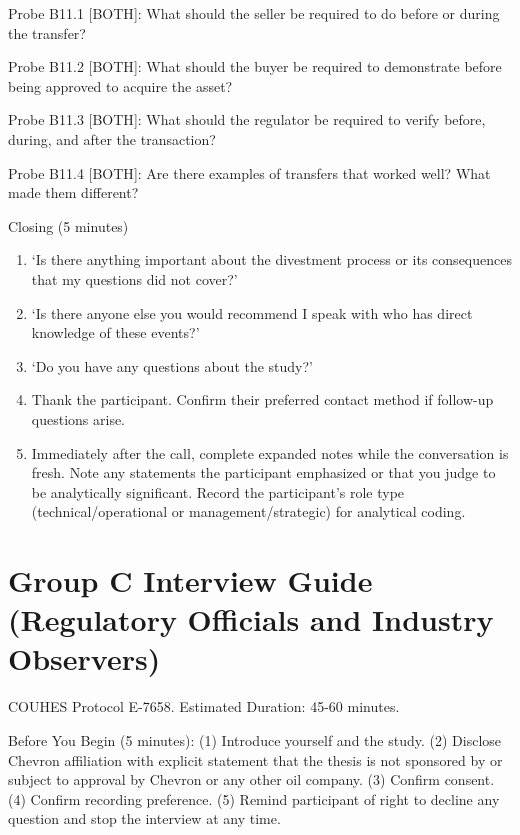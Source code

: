 Probe B11.1 {[}BOTH{]}: What should the seller be required to do before
or during the transfer?

Probe B11.2 {[}BOTH{]}: What should the buyer be required to demonstrate
before being approved to acquire the asset?

Probe B11.3 {[}BOTH{]}: What should the regulator be required to verify
before, during, and after the transaction?

Probe B11.4 {[}BOTH{]}: Are there examples of transfers that worked
well? What made them different?

Closing (5 minutes)

\begin{enumerate}
\def\labelenumi{\arabic{enumi}.}
\item
  `Is there anything important about the divestment process or its
  consequences that my questions did not cover?'
\item
  `Is there anyone else you would recommend I speak with who has direct
  knowledge of these events?'
\item
  `Do you have any questions about the study?'
\item
  Thank the participant. Confirm their preferred contact method if
  follow-up questions arise.
\item
  Immediately after the call, complete expanded notes while the
  conversation is fresh. Note any statements the participant emphasized
  or that you judge to be analytically significant. Record the
  participant's role type (technical/operational or
  management/strategic) for analytical coding.
\end{enumerate}

\hypertarget{group-c-interview-guide-regulatory-officials-and-industry-observers}{%
\section{Group C Interview Guide (Regulatory Officials and Industry
Observers)}\label{group-c-interview-guide-regulatory-officials-and-industry-observers}}

COUHES Protocol E-7658. Estimated Duration: 45-60 minutes.

Before You Begin (5 minutes): (1) Introduce yourself and the study. (2)
Disclose Chevron affiliation with explicit statement that the thesis is
not sponsored by or subject to approval by Chevron or any other oil
company. (3) Confirm consent. (4) Confirm recording preference. (5)
Remind participant of right to decline any question and stop the
interview at any time.

